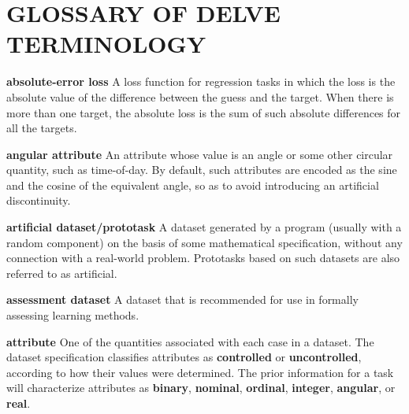%
%
\newpage

\section{GLOSSARY OF DELVE TERMINOLOGY}\label{app-glossary}
\thispagestyle{plain}
\setcounter{figure}{0}

\vspace{4pt}

\small
\begin{list}{}{%
\setlength{\itemsep}{0in}%
\setlength{\leftmargin}{2.25in}%
\setlength{\labelsep}{0in}%
\setlength{\labelwidth}{2.25in}}

\item[\bf absolute-error loss \hfill]
A loss function for regression tasks in which the loss is the
absolute value of the difference between the guess and the
target.  When there is more than one target, the absolute loss 
is the sum of such absolute differences for all the targets.

\item[\bf angular attribute \hfill]
An attribute whose value is an angle or some other circular
quantity, such as time-of-day.  By default, such attributes
are encoded as the sine and the cosine of the equivalent angle,
so as to avoid introducing an artificial discontinuity.

\item[\bf artificial dataset/prototask \hfill]
A dataset generated by a program (usually with a random component)
on the basis of some mathematical specification, without any
connection with a real-world problem.  Prototasks based on 
such datasets are also referred to as artificial.

\item[\bf assessment dataset \hfill]
A dataset that is recommended for use in formally assessing
learning methods.

\item[\bf attribute \hfill]
One of the quantities associated with each case in a dataset.
The dataset specification classifies attributes as {\bf controlled} 
or {\bf uncontrolled}, according to how their values were determined.  
The prior information for a task will characterize attributes
as {\bf binary}, {\bf nominal}, {\bf ordinal}, {\bf integer}, {\bf angular},
or {\bf real}.


\end{list}
